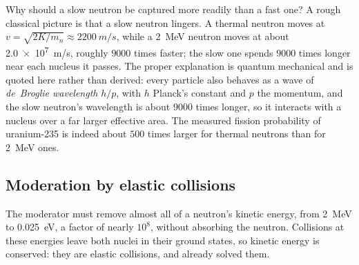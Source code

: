 Why should a slow neutron be captured more readily than a fast one? A rough classical picture is that a
slow neutron lingers. A thermal neutron moves at $v=\sqrt{2K/m_n}\approx\SI{2200}{m/s}$, while a
\SI{2}{\MeV} neutron moves at about \SI{2.0e7}{m/s}, roughly $9000$ times faster; the slow one spends
$9000$ times longer near each nucleus it passes. The proper explanation is quantum mechanical and is
quoted here rather than derived: every particle also behaves as a wave of \emph{de~Broglie wavelength}
$h/p$, with $h$ Planck's constant and $p$ the momentum, and the slow neutron's wavelength is about $9000$
times longer, so it interacts with a nucleus over a far larger effective area. The measured fission
probability of uranium-235 is indeed about $500$ times larger for thermal neutrons than for
\SI{2}{\MeV} ones.

\subsection{Moderation by elastic collisions}

The moderator must remove almost all of a neutron's kinetic energy, from \SI{2}{\MeV} to
\SI{0.025}{eV}, a factor of nearly $10^8$, without absorbing the neutron. Collisions at these energies
leave both nuclei in their ground states, so kinetic energy is conserved: they are elastic collisions, and
 already solved them.

